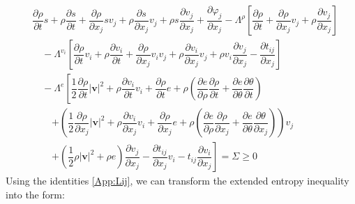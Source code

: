 \documentclass[a4paper,fleqn]{cas-sc}
\theoremstyle{definition}
\begin{document}
\begin{align} \label{produkcija entropije Ojlerovi fluidi}
	& \dfrac{\partial\rho}{\partial t}s+\rho\dfrac{\partial s}{\partial t}+\dfrac{\partial\rho}{\partial x_j}sv_j+\rho\dfrac{\partial s}{\partial x_j}v_j+\rho s \dfrac{\partial v_j}{\partial x_j}
	+\dfrac{\partial\varphi_j}{\partial x_j}-\Lambda^\rho\left[\dfrac{\partial\rho}{\partial t}+\dfrac{\partial\rho}{\partial x_j}v_j+\rho\dfrac{\partial v_j}{\partial x_j}\right]
	\nonumber \\
	& \quad -\Lambda^{v_i}\left[\dfrac{\partial\rho}{\partial t}v_i+\rho\dfrac{\partial v_i}{\partial t}+\dfrac{\partial\rho}{\partial x_j}v_iv_j+\rho\dfrac{\partial v_i}{\partial x_j}v_j+\rho v_i\dfrac{\partial v_j}{\partial x_j}-\dfrac{\partial t_{ij}}{\partial x_j}\right]
	\\
	& \quad -\Lambda^ e\left[\dfrac{1}{2}\dfrac{\partial\rho}{\partial t}|\mathbf{v}|^2+\rho\dfrac{\partial v_i}{\partial t}v_i+\dfrac{\partial\rho}{\partial t} e+\rho\left(\dfrac{\partial e}{\partial\rho}\dfrac{\partial\rho}{\partial t}+\dfrac{\partial e}{\partial\theta}\dfrac{\partial\theta}{\partial t}\right)\right.
	\nonumber \\
	& \qquad \left.+\left(\dfrac{1}{2}\dfrac{\partial\rho}{\partial x_j}|\mathbf{v}|^2+\rho\dfrac{\partial v_i}{\partial x_j}v_i+\dfrac{\partial\rho}{\partial x_j} e+\rho\left(\dfrac{\partial e}{\partial\rho}\dfrac{\partial\rho}{\partial x_j}+\dfrac{\partial e}{\partial\theta}\dfrac{\partial\theta}{\partial x_j}\right)\right)v_j\right. 
	\nonumber \\
	& \qquad \left.+\left(\dfrac{1}{2}\rho|\mathbf{v}|^2+\rho
	e\right)\dfrac{\partial v_j}{\partial x_j}-\dfrac{\partial t_{ij}}{\partial x_j}v_i-t_{ij}\dfrac{\partial v_i}{\partial x_j}\right]=\Sigma\geq 0 
	\nonumber
\end{align}
Using the identities \eqref{App:Lij}, we can transform the extended entropy inequality into the form: 
\end{document}
